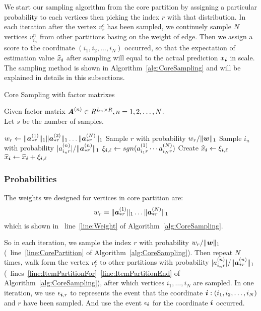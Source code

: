 \documentclass[letterpaper]{article}
\newcommand{\Sca}[3]{{#1}^{(#2)}_{i_#2#3}}%
\newcommand{\anr}[2]{\Sca{a}{#1}{#2}}
\newcommand{\score}[1]{\xi_{\V{i},#1}}
\newcommand{\V}[1]{{\bm{{\MakeLowercase{#1}}}}}
\newcommand{\VnC}[3]{\V{#1}^{(#2)}_{#3}}
\newcommand{\Nrocl}[2]{\norm{\VnC{a}{#1}{*#2}}{1}}
\newcommand{\Vacol}[1]{\V{a}^{(#1)}_{*r}}
\newcommand{\M}[1]{{\bm{{\MakeUppercase{#1}}}}}
\newcommand{\norm}[2]{\|#1\|_{#2}}
\newcommand{\Alg}[1] {Algorithm~\ref{alg:#1}}
\newcommand{\AlgLine}[2]{line~\ref{line:#2} of Algorithm~\ref{alg:#1}}
\newcommand{\AlgLines}[3]{lines~\ref{line:#2}--\ref{line:#3} of Algorithm~\ref{alg:#1}}
\newcommand{\coord}{(i_1,i_2,\ldots,i_N)}
\newcommand{\WeightR}{\Nrocl{1}{r}\ldots\Nrocl{N}{r}}
\newcommand{\predx}{\widehat{x}_{\V{i}}}
\begin{document}
We start our sampling algorithm from the core partition
by assigning a particular probability to each vertices
then picking the index $r$ with that distribution.
In each iteration after the vertex $v^c_r$ has been sampled,
we continuely sample $N$ vertices $v^{n}_{i_n}$ from other partitions
basing on the weight of edge.
Then we assign a score to the coordinate $\coord$ occurred,
so that the expectation of estimation value $\widehat{x}_\V{i}$
after sampling will equal to the actual prediction $x_\V{i}$ in scale.
The sampling method is shown in \Alg{CoreSampling} and will be explained in details
in this subsections.
\begin{algorithm}[!ht]
    \caption{Core Sampling with factor matrixes}
    \label{alg:CoreSampling}
    Given factor matrix $\M{A}^{(n)}\in R^{L_n\times R}, n = 1,2,\ldots,N$.\\
    Let $s$ be the number of samples.
    \begin{algorithmic}[1]
    \State $w_r \leftarrow \Nrocl{1}{r}\norm{\Vacol{2}}{1}\ldots\Nrocl{N}{r}$
    \label{line:Weight}
    \EndFor
    \State Sample $r$ with probability $w_r/\norm{\V{W}}{1}$
    \label{line:CorePartition}
    \label{line:ItemPartitionFor}
    \State Sample $i_n$ with probability $|\anr{n}{r}|/\norm{\Vacol{n}}{1}$
    \EndFor
    \label{line:ItemPartitionEnd}
    \State
    \label{line:Scoring}
        $\score{\ell} \leftarrow sgn(\anr{1}{r}\cdots\anr{N}{r})$
    \If {$\V{i}=\coord$ has not been sampled}
    \State  Create $\predx \leftarrow \score{\ell} $
    \Else
    \State $\predx \leftarrow \predx + \score{\ell}$
    \EndIf
    \EndFor
    \label{line:ScoringEnd}
    \end{algorithmic}
\end{algorithm}

\subsubsection{Probabilities}
The weights we designed for vertices in core partition are:
\[
    w_r = \WeightR
\]
which is shown in ~\AlgLine{CoreSampling}{Weight}.

So in each iteration, we sample the index $r$
with probability $w_r/\norm{\V{w}}{1}$
(~\AlgLine{CoreSampling}{CorePartition}).
Then repeat $N$ times,
walk form the vertex $v^c_r$ to other partitions with probability
$|\anr{n}{r}|/\norm{\Vacol{n}}{1}$
(~\AlgLines{CoreSampling}{ItemPartitionFor}{ItemPartitionEnd}),
after which vertices $i_1,\ldots,i_N$ are sampled.
In one iteration, we use $\epsilon_{\V{i},r}$ to represents the event that
the coordinate $\V{i}:\coord$ and $r$ have been sampled.
And use the event $\epsilon_{\V{i}}$ for the coordinate $\V{i}$ occurred.
\end{document}
